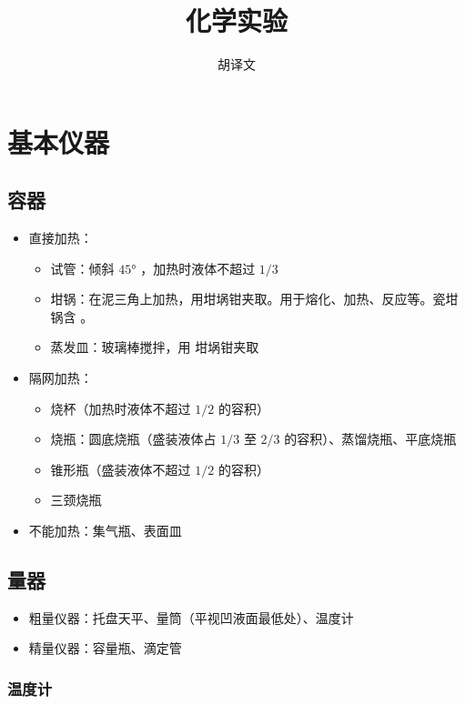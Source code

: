 \documentclass[10pt]{article}
\title{化学实验}
\author{胡译文}
\date{}
\begin{document}
	\maketitle
	\tableofcontents
	
	
	\clearpage
	\section{基本仪器}
	
	
	\subsection{容器}
	\begin{itemize}
		\item 直接加热：
		\begin{itemize}
			\item 试管：倾斜 $\ang{45}$ ，加热时液体不超过 $1/3$
			\item 坩锅：在泥三角上加热，用坩埚钳夹取。用于熔化、加热、反应等。瓷坩锅含 。
			\item 蒸发皿：玻璃棒搅拌，用 坩埚钳夹取
		\end{itemize}
		\item 隔网加热：
		\begin{itemize}
			\item 烧杯（加热时液体不超过 $1/2$ 的容积）
			\item 烧瓶：圆底烧瓶（盛装液体占 $1/3$ 至 $2/3$ 的容积）、蒸馏烧瓶、平底烧瓶
			\item 锥形瓶（盛装液体不超过 $1/2$ 的容积）
			\item 三颈烧瓶
		\end{itemize}
		\item 不能加热：集气瓶、表面皿
	\end{itemize}
	
	
	\subsection{量器}
	\begin{itemize}
		\item 粗量仪器：托盘天平、量筒（平视凹液面最低处）、温度计
		\item 精量仪器：容量瓶、滴定管
	\end{itemize}
	
	\subsubsection{温度计}
	
\end{document}
